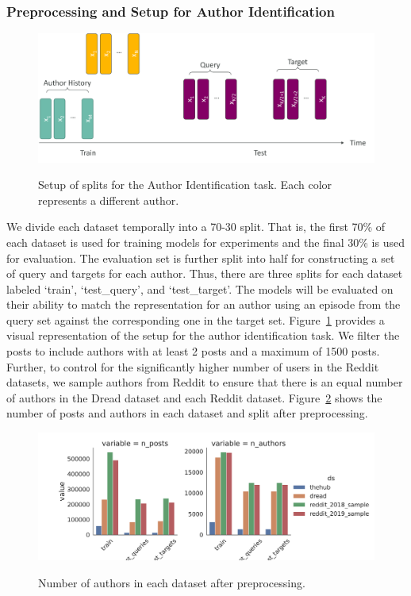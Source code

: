 \subsubsection{Preprocessing and Setup for Author Identification}
\begin{figure}
    \centering
    \includegraphics[width=0.9\linewidth,alt={Diagram showing how data is split for author identificaiton.}]{stylometryExtensions/figures/train_query_target_split}
    \caption{Setup of splits for the Author Identification task. Each color represents a different author.}
    \label{fig:stylometry_extensions:followingTrail:datasets:splits}
\end{figure}
We divide each dataset temporally into a 70-30 split.
That is, the first 70\% of each dataset is used for training models for experiments and the final 30\% is used for evaluation.
The evaluation set is further split into half for constructing a set of query and targets for each author.
Thus, there are three splits for each dataset labeled `train', `test\_query', and `test\_target'.
The models will be evaluated on their ability to match the representation for an author using an episode from the query set against the corresponding one in the target set.
Figure~\ref{fig:stylometry_extensions:followingTrail:datasets:splits} provides a visual representation of the setup for the author identification task. 
We filter the posts to include authors with at least 2 posts and a maximum of 1500 posts.
Further, to control for the significantly higher number of users in the Reddit datasets, we sample authors from Reddit to ensure that there is an equal number of authors in the Dread dataset and each Reddit dataset.
Figure~\ref{fig:stylometry_extensions:followingTrail:datasets:final_splits} shows the number of posts and authors in each dataset and split after preprocessing.


\begin{figure}
    \centering
    \includegraphics[width=0.9\linewidth,alt={Bar chart showing final statistics for each split.}]{stylometryExtensions/figures/FinalSplits}
    \caption{Number of authors in each dataset after preprocessing.}
    \label{fig:stylometry_extensions:followingTrail:datasets:final_splits}
\end{figure}

